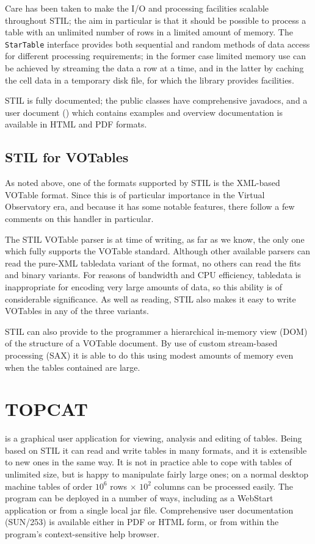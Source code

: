 \documentclass[11pt,twoside]{article}  %
\begin{document}
Care has been taken to make the I/O and processing facilities scalable
throughout STIL; the aim in particular is that it should be possible 
to process a table with an unlimited number of rows 
in a limited amount of memory.  
The {\tt StarTable} interface provides both sequential and random
methods of data access for different processing requirements; 
in the former case limited memory use can be achieved
by streaming the data a row at a time, and in the latter by
caching the cell data in a temporary disk file, for which the
library provides facilities.

STIL is fully documented; the public classes have comprehensive javadocs,
and a user document 
() 
which contains examples and overview
documentation is available in HTML and PDF formats.

\subsection{STIL for VOTables}

As noted above, one of the formats supported by STIL is the XML-based
VOTable format.  Since this is of particular importance in the Virtual
Observatory era, and because it has some notable features, there follow
a few comments on this handler in particular.

The STIL VOTable parser is at time of writing, 
as far as we know, the only one
which fully supports the VOTable standard.
Although other available parsers can read the pure-XML {\sc tabledata} 
variant of the format, no others can read the {\sc fits} and {\sc binary} 
variants.
For reasons of bandwidth and CPU efficiency, {\sc tabledata} is inappropriate
for encoding very large amounts of data, so this ability is of
considerable significance.  As well as reading,
STIL also makes it easy to write VOTables in any of the three variants.

STIL can also provide to the programmer a hierarchical in-memory view
(DOM) of the structure of a VOTable document.  By use of custom 
stream-based processing (SAX) it is able to do this using modest
amounts of memory even when the tables contained are large.


\section{TOPCAT}

is a graphical user application for viewing, analysis and editing
of tables.  Being based on STIL it can read and write tables in
many formats, and it is extensible to new ones in the same way.
It is not in practice able to cope with tables of unlimited size,
but is happy to manipulate fairly large ones; on a normal desktop
machine tables of order $10^6$ rows $\times$ $10^2$ columns can be 
processed easily.
The program can be deployed in a number of ways, including as a WebStart 
application or from a single local jar file.
Comprehensive user documentation (SUN/253) is available either in PDF or HTML
form, or from within the program's context-sensitive help browser.
\end{document}
